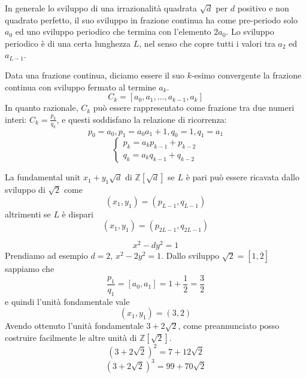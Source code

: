 \begin{proposizione}
	In generale lo sviluppo di una irrazionalità quadrata $\sqrt{d}$ per $d$ positivo e non quadrato perfetto, il suo sviluppo in frazione continua ha come pre-periodo solo $a_0$ ed uno sviluppo periodico che termina con l'elemento $2a_0$. Lo sviluppo periodico è di una certa lunghezza $L$, nel senso che copre tutti i valori tra $a_2$ ed $a_{L-1}$.
\end{proposizione}
\begin{definizione}
	Data una frazione continua, diciamo essere il suo $k$-esimo convergente la frazione continua con sviluppo fermato al termine $a_k$. 
	\begin{equation*}
	C_k=\left[a_0,a_1,\dots,a_{k-1},a_k\right]
	\end{equation*}
	In quanto razionale, $C_k$ può essere rappresentato come frazione tra due numeri interi: $C_k=\frac{p_k}{q_k}$, e questi soddisfano la relazione di ricorrenza:
	\begin{equation*}
	p_0=a_0,p_1=a_0a_1+1,q_0=1,q_1=a_1
	\end{equation*}
	\begin{equation*}
	\begin{cases}
	p_k=a_kp_{k-1}+p_{k-2}\\
	q_k=a_kq_{k-1}+q_{k-2}
	\end{cases}
	\end{equation*}
\end{definizione}
\begin{teorema}
	La fundamental unit $x_1+y_1\sqrt{d}$ di $\mathbb{Z}[\sqrt{d}]$ se $L$ è pari può essere ricavata dallo sviluppo di $\sqrt{2}$ come 
	\begin{equation*}
	(x_1,y_1)=\left(p_{L-1},q_{L-1}\right)
	\end{equation*}
	altrimenti se $L$ è dispari
	\begin{equation*}
	(x_1,y_1)=\left(p_{2L-1},q_{2L-1}\right)
	\end{equation*}
\end{teorema}
\begin{osservazione}
	\begin{equation*}
	x^2-dy^2=1
	\end{equation*}
	Prendiamo ad esempio $d=2$, $x^2-2y^2=1$. Dallo sviluppo $\sqrt{2}=\left[1,\overline{2}\right]$ sappiamo che 
	\begin{equation*}
	\frac{p_1}{q_1}=\left[a_0,a_1\right]=1+\frac{1}{2}=\frac{3}{2}
	\end{equation*}
	e quindi l'unità fondamentale vale
	\begin{equation*}
	(x_1,y_1)=(3,2)
	\end{equation*}
	Avendo ottenuto l'unità fondamentale $3+2\sqrt{2}$, come preannunciato posso costruire facilmente le altre unità di $\mathbb{Z}[\sqrt{2}]$.
	\begin{equation*}
	\left(3+2\sqrt{2}\right)^2=7+12\sqrt{2}
	\end{equation*}
	\begin{equation*}
	\left(3+2\sqrt{2}\right)^3=99+70\sqrt{2}
	\end{equation*}
\end{osservazione}




